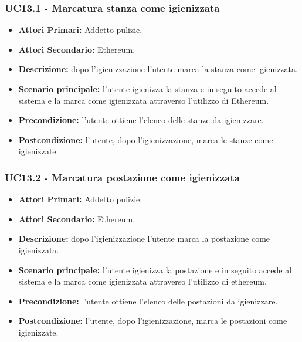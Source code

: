 \subsubsection{UC13.1 - Marcatura stanza come igienizzata}
\begin{itemize}
           	\item\textbf{Attori Primari:} Addetto pulizie.
		\item\textbf{Attori Secondario:} Ethereum.
           	\item\textbf{Descrizione:} dopo l'igienizzazione l'utente marca la stanza come igienizzata.
           	\item\textbf{Scenario principale:} l'utente igienizza la stanza e in seguito accede al sistema e la marca come igienizzata attraverso l'utilizzo di Ethereum.
           	\item\textbf{Precondizione:} l'utente ottiene l'elenco delle stanze da igienizzare.
           	\item\textbf{Postcondizione:} l'utente, dopo l'igienizzazione, marca le stanze come igienizzate.
\end{itemize}
\subsubsection{UC13.2 - Marcatura postazione come igienizzata}
\begin{itemize}
           	\item\textbf{Attori Primari:} Addetto pulizie.
		\item\textbf{Attori Secondario:} Ethereum.
           	\item\textbf{Descrizione:} dopo l'igienizzazione l'utente marca la postazione come igienizzata.
           	\item\textbf{Scenario principale:} l'utente igienizza la postazione e in seguito accede al sistema e la marca come igienizzata attraverso l'utilizzo di ethereum.
           	\item\textbf{Precondizione:} l'utente ottiene l'elenco delle postazioni da igienizzare.
           	\item\textbf{Postcondizione:} l'utente, dopo l'igienizzazione, marca le postazioni come igienizzate.
\end{itemize}
